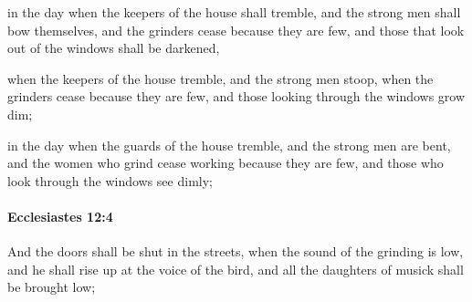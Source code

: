 			\begin{versebox}
					\item[BHS] 
					\item[LXX] 
					\item[ASV] in the day when the keepers of the house shall tremble, and the strong men shall bow themselves, and the grinders cease because they are few, and those that look out of the windows shall be darkened,
					\item[NIV] when the keepers of the house tremble, and the strong men stoop, when the grinders cease because they are few, and those looking through the windows grow dim;
					\item[NRSV] in the day when the guards of the house tremble, and the strong men are bent, and the women who grind cease working because they are few, and those who look through the windows see dimly;
			\end{versebox}

		\paragraph{Ecclesiastes 12:4} %
			\label{ECCLESIASTES-12-4}

			And the doors shall be shut in the streets, when the sound of the grinding is low, and he shall rise up at the voice of the bird, and all the daughters of musick shall be brought low;

